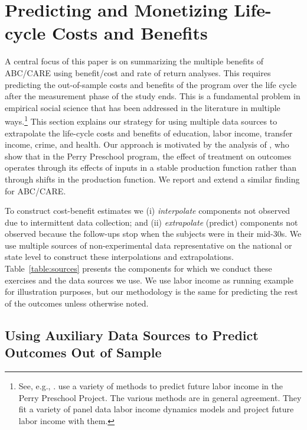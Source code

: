 \section{Predicting and Monetizing Life-cycle Costs and Benefits}\label{section:cbamethodology}

A central focus of this paper is on summarizing the multiple benefits of ABC/CARE using benefit/cost and rate of return analyses. This requires predicting the out-of-sample costs and benefits of the program over the life cycle after the measurement phase of the study ends. This is a fundamental problem in empirical social science that has been addressed in the literature in multiple ways.\footnote{See, e.g., \cite{Heckman_Lochner_ea_2006_HEE}. \citet{Heckman_Moon_etal_2010_RateofReturn} use a variety of methods to predict future labor income in the Perry Preschool Project. The various methods are in general agreement. They fit a variety of panel data labor income dynamics models and project future labor income with them.} This section explains our strategy for using multiple data sources to extrapolate the life-cycle costs and benefits of education, labor income, transfer income, crime, and health. Our approach is motivated by the analysis of \citet{Heckman_Pinto_etal_2013_PerryFactor}, who show that in the Perry Preschool program, the effect of treatment on outcomes operates through its effects of inputs in a stable production function rather than through shifts in the production function. We report and extend a similar finding for ABC/CARE.

To construct cost-benefit estimates we (i) \textit{interpolate} components not observed due to intermittent data collection; and (ii) \textit{extrapolate} (predict) components not observed because the follow-ups stop when the subjects were in their mid-30s. We use multiple sources of non-experimental data representative on the national or state level to construct these interpolations and extrapolations. Table~\ref{table:sources} presents the components for which we conduct these exercises and the data sources we use. We use labor income as running example for illustration purposes, but our methodology is the same for predicting the rest of the outcomes unless otherwise noted.

\subsection{Using Auxiliary Data Sources to Predict Outcomes Out of Sample}\label{sec:necrosis}

